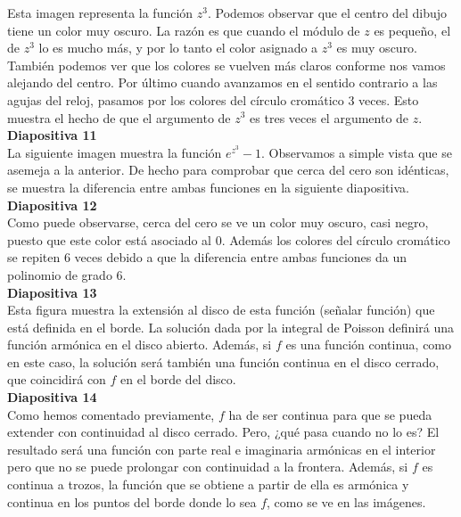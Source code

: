 \documentclass[spanish, a4paper, 12pt]{article}
\begin{document}
Esta imagen representa la función $z^3$. Podemos observar que el centro del dibujo tiene un color muy oscuro. La razón es que cuando el módulo de $z$ es pequeño, el de $z^3$ lo es mucho más, y por lo tanto el color asignado a $z^3$ es muy oscuro. También podemos ver que los colores se vuelven más claros conforme nos vamos alejando del centro. Por último cuando avanzamos en el sentido contrario a las agujas del reloj, pasamos por los colores del círculo cromático $3$ veces. Esto muestra el hecho de que el argumento de $z^3$ es tres veces el argumento de $z$. \\

\textbf{Diapositiva 11} \\

La siguiente imagen muestra la función $e^{z^3}-1$. Observamos a simple vista que se asemeja a la anterior. De hecho para comprobar que cerca del cero son idénticas, se muestra la diferencia entre ambas funciones en la siguiente diapositiva. \\

\textbf{Diapositiva 12} \\

Como puede observarse, cerca del cero se ve un color muy oscuro, casi negro, puesto que este color está asociado al $0$. Además los colores del círculo cromático se repiten $6$ veces debido a que la diferencia entre ambas funciones da un polinomio de grado $6$. \\

\textbf{Diapositiva 13} \\

Esta figura muestra la extensión al disco de esta función (señalar función) que está definida en el borde. La solución dada por la integral de Poisson definirá una función armónica en el disco abierto. Además, si $f$ es una función continua, como en este caso, la solución será también una función continua en el disco cerrado, que coincidirá con $f$ en el borde del disco. \\

\textbf{Diapositiva 14} \\

Como hemos comentado previamente, $f$ ha de ser continua para que se pueda extender con continuidad al disco cerrado. Pero, ¿qué pasa cuando no lo es? El resultado será una función con parte real e imaginaria armónicas en el interior pero que no se puede prolongar con continuidad a la frontera. Además, si $f$ es continua a trozos, la función que se obtiene a partir de ella es armónica y continua en los puntos del borde donde lo sea $f$, como se ve en las imágenes. \\
\end{document}
